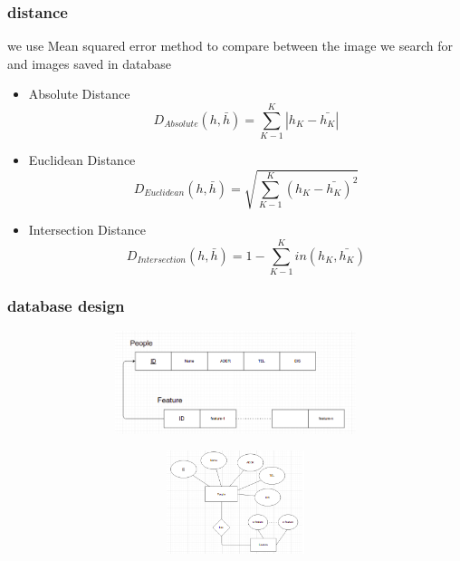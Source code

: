 \documentclass{beamer}
\begin{document}
	\begin{frame}
		\frametitle{distance}
		we use Mean squared error method to compare between the image we search for
		and images saved in database
		\begin{itemize}
			\item Absolute Distance \\
			\begin{equation}
				D_{Absolute}(h,\bar{h})= \sum_{K-1}^{K} |h_{K}-\bar{h_{K}}|
			\end{equation}
			\item Euclidean Distance \\
			\begin{equation}
				D_{Euclidean}(h,\bar{h})= \sqrt{\sum_{K-1}^{K} (h_{K}-\bar{h_{K}})^{2}}
			\end{equation}
			\item Intersection Distance \\
			\begin{equation}
				D_{Intersection}(h,\bar{h})= 1- \sum_{K-1}^{K} in(h_{K},\bar{h_{K}})
			\end{equation}
			
			
			
		\end{itemize}
		
	\end{frame}
	
	\begin{frame}
		\frametitle{database design}
		\begin{figure}[H]
			\centering
			\includegraphics[width=120mm,height=30mm]{fig/24.png}
		\end{figure}
		\begin{figure}[H]
			\centering
			\includegraphics[width=120mm,height=30mm]{fig/25.png}
		\end{figure}
	\end{frame}
	
\end{document}
